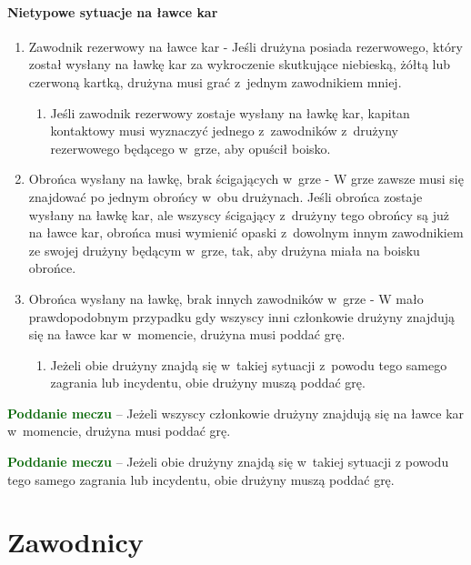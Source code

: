 \documentclass[12pt]{article}
\newcommand\other[1]{\bgroup\textcolor{darkgreen}{\textbf{#1}}}
\begin{document}
\paragraph{Nietypowe sytuacje na ławce kar}

\begin{enumerate}
	\item
	      Zawodnik rezerwowy na ławce kar - Jeśli drużyna posiada rezerwowego,
	      który został wysłany na ławkę kar za wykroczenie skutkujące niebieską,
	      żółtą lub czerwoną kartką, drużyna musi grać z~jednym zawodnikiem
	      mniej.

	      \begin{enumerate}
		      \item
		            Jeśli zawodnik rezerwowy zostaje wysłany na ławkę kar, kapitan
		            kontaktowy musi wyznaczyć jednego z~zawodników z~drużyny rezerwowego
		            będącego w~grze, aby opuścił boisko.
	      \end{enumerate}
	\item
	      Obrońca wysłany na ławkę, brak ścigających w~grze - W grze zawsze musi
	      się znajdować po jednym obrońcy w~obu drużynach. Jeśli obrońca zostaje
	      wysłany na ławkę kar, ale wszyscy ścigający z~drużyny tego obrońcy są
	      już na ławce kar, obrońca musi wymienić opaski z~dowolnym innym
	      zawodnikiem ze swojej drużyny będącym w~grze, tak, aby drużyna miała
	      na boisku obrońce.
	\item
	      Obrońca wysłany na ławkę, brak innych zawodników w~grze - W mało
	      prawdopodobnym przypadku gdy wszyscy inni członkowie drużyny znajdują
	      się na ławce kar w~momencie, drużyna musi poddać grę.

	      \begin{enumerate}
		      \item
		            Jeżeli obie drużyny znajdą się w~takiej sytuacji z~powodu tego
		            samego zagrania lub incydentu, obie drużyny muszą poddać grę.
	      \end{enumerate}
\end{enumerate}

\other{Poddanie meczu} -- Jeżeli wszyscy członkowie drużyny znajdują się
na ławce kar w~momencie, drużyna musi poddać grę.

\other{Poddanie meczu} -- Jeżeli obie drużyny znajdą się w~takiej sytuacji
z powodu tego samego zagrania lub incydentu, obie drużyny muszą poddać
grę.


\pagebreak
\section{Zawodnicy}
\end{document}
